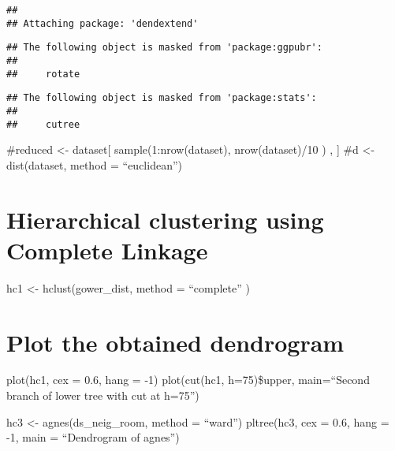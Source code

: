 \documentclass[
]{article}
\newenvironment{Shaded}{\begin{snugshade}}{\end{snugshade}}
\newcommand{\CommentTok}[1]{\textcolor[rgb]{0.56,0.35,0.01}{\textit{#1}}}
\begin{document}
\begin{verbatim}
## 
## Attaching package: 'dendextend'
\end{verbatim}

\begin{verbatim}
## The following object is masked from 'package:ggpubr':
## 
##     rotate
\end{verbatim}

\begin{verbatim}
## The following object is masked from 'package:stats':
## 
##     cutree
\end{verbatim}

\#reduced \textless- dataset{[} sample(1:nrow(dataset), nrow(dataset)/10
) , {]} \#d \textless- dist(dataset, method = ``euclidean'')

\hypertarget{hierarchical-clustering-using-complete-linkage}{%
\section{Hierarchical clustering using Complete
Linkage}\label{hierarchical-clustering-using-complete-linkage}}

hc1 \textless- hclust(gower\_dist, method = ``complete'' )

\hypertarget{plot-the-obtained-dendrogram}{%
\section{Plot the obtained
dendrogram}\label{plot-the-obtained-dendrogram}}

plot(hc1, cex = 0.6, hang = -1) plot(cut(hc1, h=75)\$upper,
main=``Second branch of lower tree with cut at h=75'')

\begin{Shaded}
\end{Shaded}

hc3 \textless- agnes(ds\_neig\_room, method = ``ward'') pltree(hc3, cex
= 0.6, hang = -1, main = ``Dendrogram of agnes'')
\end{document}
